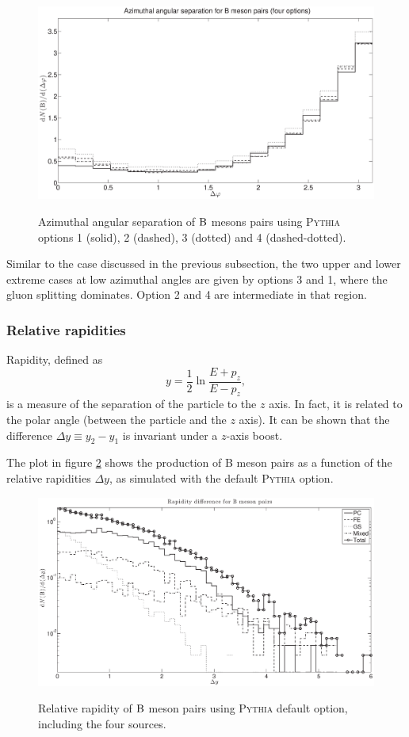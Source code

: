 \documentclass[a4paper,12pt]{article}
\begin{document}
\begin{figure}[!h]
\centering
\caption[$\B$ meson pairs azimuthal angular separation. Four \textsc{Pythia} options.]{Azimuthal angular separation of $\B$ mesons pairs using \textsc{Pythia} options 1 (solid), 2 (dashed), 3 (dotted) and 4 (dashed-dotted).}
\includegraphics[width=15cm]{BBPhi4Op.eps}
\label{fig:BBPhi4Op}
\end{figure}
Similar to the case discussed in the previous subsection, the two upper and lower extreme cases at low azimuthal angles are given by options 3 and 1, where the gluon splitting dominates. Option 2 and 4 are intermediate in that region.

\subsubsection{Relative rapidities}

Rapidity, defined as
$$
y =\frac12 \ln \frac{E+p_z}{E-p_z},
$$
is a measure of the separation of the particle to the $z$ axis. In fact, it is related to the polar angle (between the particle and the $z$ axis). It can be shown that the difference $\Delta y \equiv y_2 - y_1$ is invariant under a $z$-axis boost.

The plot in figure \ref{fig:BBYOp1} shows the production of B meson pairs as a function of the relative rapidities $\Delta y$, as simulated with the default \textsc{Pythia} option.

\begin{figure}[!h]
\centering
\caption[$\B$ meson pairs relative rapidity. \textsc{Pythia} default option.]{Relative rapidity of $\B$ meson pairs using \textsc{Pythia} default option, including the four sources.}
\includegraphics[width=15cm]{BBYOp1.eps}
\label{fig:BBYOp1}
\end{figure}
\end{document}

